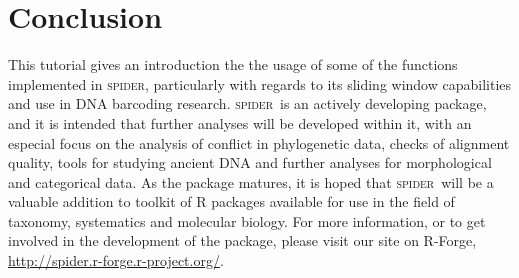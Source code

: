 \documentclass{article}
\newcommand{\spider}{\textsc{spider}~} %
\newcommand{\Spider}{\textsc{spider}} %
\newcommand{\progname}[1]{\textsc{#1}}
\begin{document}
\section{Conclusion}
This tutorial gives an introduction the the usage of some of the functions implemented in \Spider, particularly with regards to its sliding window capabilities and use in DNA barcoding research. 
\spider is an actively developing package, and it is intended that further analyses will be developed within it, with an especial focus on the analysis of conflict in phylogenetic data, checks of alignment quality, tools for studying ancient DNA and further analyses for morphological and categorical data.
As the package matures, it is hoped that \spider will be a valuable addition to toolkit of \progname{R} packages available for use in the field of taxonomy, systematics and molecular biology. For more information, or to get involved in the development of the package, please visit our site on R-Forge, \href{http://spider.r-forge.r-project.org/}{http://spider.r-forge.r-project.org/}.




\end{document}
